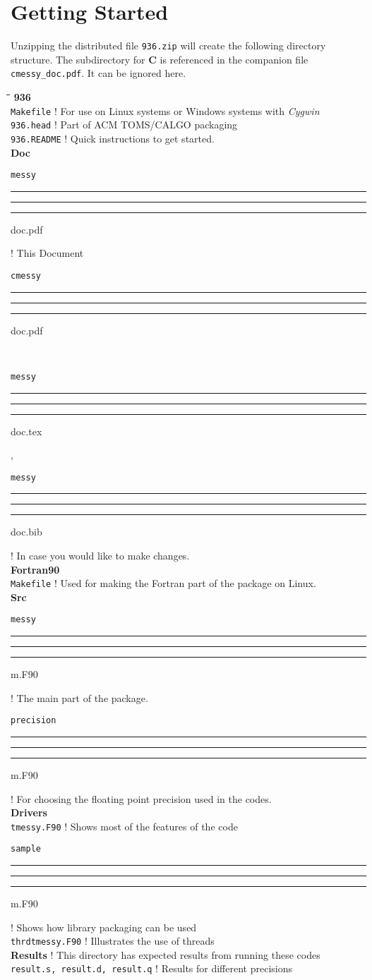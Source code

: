\documentclass[12pt]{article}
\DeclareRobustCommand{\us}{\rule{.2pt}{0pt}\rule[-.8pt]{.4em}{.5pt}%
  \rule{.2pt}{0pt}}
\DeclareRobustCommand{\us}{\rule{.2pt}{0pt}\rule[-.8pt]{.4em}{.5pt}%
  \rule{.2pt}{0pt}}
\begin{document}
\section{Getting Started}
Unzipping the distributed file {\tt 936.zip} will create the following directory
structure.  The subdirectory for {\bf C} is referenced in the companion file
{\tt cmessy\_doc.pdf}.  It can be ignored here.

\begin{tabbing}
  \hspace{12pt}\=\hspace{12pt}\=\hspace{12pt}\=\hspace{12pt}\=\kill
  {\bf 936}\+\\
  {\tt Makefile} ! For use on Linux systems or Windows systems with {\em Cygwin}\\
  {\tt 936.head} ! Part of ACM TOMS/CALGO packaging\\
  {\tt 936.README} ! Quick instructions to get started.\\
  {\bf Doc}\+\\
  {\tt messy\us doc.pdf} ! This Document\\
  {\tt cmessy\us doc.pdf}\\
  {\tt messy\us doc.tex}, {\tt messy\us doc.bib} ! In case you would like to
  make changes.\-\\
  {\bf Fortran90}\+\\
  {\tt Makefile} ! Used for making the Fortran part of the package on Linux.\\
  {\bf Src}\+\\
  {\tt messy\us m.F90} ! The main part of the package.\\
  {\tt precision\us m.F90} ! For choosing the floating point precision used in
  the codes.\-\\
  {\bf Drivers}\+\\
  {\tt tmessy.F90} ! Shows most of the features of the code\\
  {\tt sample\us m.F90} ! Shows how library packaging can be used\\
  {\tt thrdtmessy.F90} ! Illustrates the use of threads\\
  {\bf Results} ! This directory has expected results from running these codes\+\\
  {\tt result.s, result.d, result.q} ! Results for different precisions\\

\end{tabbing}
\end{document}
